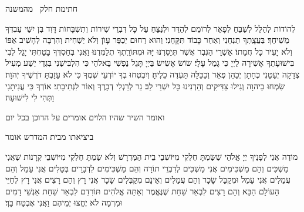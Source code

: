 \clearpage
\thispagestyle{empty}

{\centering
      \larger חתימת חלק  \sederCount\ מהמשנה

    }

    לְהוֹדוֹת לְהַלֵּל לְשַׁבֵּחַ לְפָאֵר לְרוֹמֵם לְהַדֵּר וּלְנַצֵּחַ עַל כָּל דִּבְרֵי שִׁירוֹת וְתִשְׁבָּחוֹת דָּוִד בֶּן יִשַּׁי עַבְדְּךָ מְשִׁיחֶךָ׃ בַּעֲצָֽתְךָ תַנְחֵנִי וְאַחַר כָּבוֹד תִּקָּחֵנִי׃
    וְהוּא רַחוּם יְכַפֵּר עָוֺן וְלֹא יַשְׁחִית וְהִרְבָּה לְהָשִׁיב אַפּוֹ וְלֹא יָעִיר כָּל חֲמָתוֹ׃
    אַשְׁרֵי הַגֶּבֶר אֲשֶׁר תְּיַסְּרֶנּוּ יָּהּ וּמִתּוֹרָֽתְךָ תְלַמְּדֶנּוּ׃
    וַאֲנִי בְּחַסְדְּךָ בָטַחְתִּי יָגֵל לִבִּי בִּישׁוּעָתֶךָ אָשִׁירָה לַיְיָ כִּי גָמַל עָלָי׃
    שׂוֹשׂ אָשִׂישׂ בַּיְיָ תָּגֵל נַפְשִׁי בֵּאלֹהַי כִּי הִלְבִּישַׁנִי בִּגְדֵי יֶשַׁע מְעִיל צְדָקָה יְעָטָנִי כֶּחָתָן יְכַהֵן פְּאֵר וְכַכַּלָּה תַּעְדֶּה כֵלֶיהָ׃
    וְיִבְטְחוּ בְךָ יוֹדְעֵי שְׁמֶךָ כִּי לֹא עָזַבְתָּ דֹרְשֶׁיךָ יְהוָה׃
    שִׂמְחוּ בַיהוָה וְגִילוּ צַדִּיקִים וְהַרְנִינוּ כָּל יִשְׁרֵי לֵב׃
    נֵר לְרַגְלִי דְבָרֶךָ וְאוֹר לִנְתִיבָתִי׃
    אוֹדְךָ כִּי עֲנִיתָנִי וַתְּהִי לִי לִישׁוּעָה׃

    {\centering
    {\scriptsize    ואומר השיר שהיו הלוים אומרים על הדוכן בכל יום}

      \larger ביציאתו מבית המדרש אומר

    }

    מוֹדֶה אֲנִי לְפָנֶיךָ יְיָ אֱלֹהַי שֶׁשַּׂמְתָּ חֶלְקִי מִיּוֹשְׁבֵי בֵית הַמֶּדְרָשׁ וְלֹא שַׂמְתָּ חֶלְקִי מִיּוֹשְׁבֵי קְרָנוֹת
    שֶׁאֲנִי מַשְׁכִּים וְהֵם מַשְׁכִּימִים אֲנִי מַשְׁכִּים לְדִבְרֵי תוֹרָה וְהֵם מַשְׁכִּימִים לִדְבָרֵים בְּטֵלִים
    אֲנִי עָמֵל וְהֵם עֲמֵלִים אֲנִי עָמֵל וּמְקַבֵּל שָׂכָר וְהֵם עֲמֵלִים וְאֵינָם מְקַבְּלִים שָׂכָר
    אֲנִי רָץ וְהֵם רָצִים אֲנִי רָץ לְחַיֵּי הָעוֹלָם הַבָּא וְהֵם רָצִים לִבְאֵר שַׁחַת\hdot
    שֶׁנֶּאֱמֶר וְאַתָּה אֱלֹהִים תּוֹרִדֵם לִבְאֵר שַׁחַת אַנְשֵׁי דָמִים וּמִרְמָה לֹא יֶחֱצוּ יְמֵיהֶם וַאֲנִי אֶבְטַח בָּךְ׃

